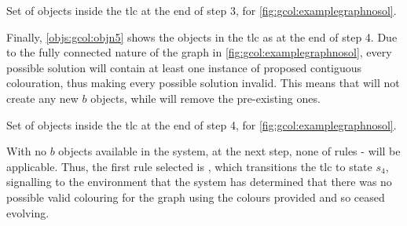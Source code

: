 \begin{cpobjectsfloat}
\begin{cpobjects}

    
    
    
        \cpobjectsline{\vdots}
        
    
    
\end{cpobjects}
\caption{\label{objs:gcol:objn4}Set of objects inside the \gls{tlc} at the end of step 3, for \cref{fig:gcol:examplegraphnosol}.}
\end{cpobjectsfloat}

Finally, \cref{objs:gcol:objn5} shows the objects in the \gls{tlc} as at the end of step 4.  Due to the fully connected nature of the graph in \cref{fig:gcol:examplegraphnosol}, every possible solution will contain at least one instance of proposed contiguous colouration, thus making every possible solution invalid.  This means that  will not create any new \(b\) objects, while  will remove the pre-existing ones.

\begin{cpobjectsfloat}
\begin{cpobjects}

    
\end{cpobjects}
\caption{\label{objs:gcol:objn5}Set of objects inside the \gls{tlc} at the end of step 4, for \cref{fig:gcol:examplegraphnosol}.}
\end{cpobjectsfloat}

With no \(b\) objects available in the system, at the next step, none of rules - will be applicable.  Thus, the first rule selected is , which transitions the \gls{tlc} to state \(s_4\), signalling to the environment that the system has determined that there was no possible valid colouring for the graph using the colours provided and so ceased evolving.